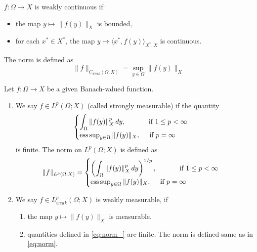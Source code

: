 \begin{defn}
    $f:\Omega \to X$ is weakly continuous if:
    \begin{itemize}
        \item the map $y \mapsto \|f(y)\|_{X}$ is bounded,
        \item for each $x^* \in X^*$, the map $y \mapsto \langle x^*, f(y)\rangle_{X^*, X}$ is continuous.
    \end{itemize} 
    The norm is defined as
    $$\|f\|_{C_{weak}(\Omega;X)} = \sup_{y \in \Omega} \|f(y)\|_{X}$$
\end{defn}
\begin{defn}

    Let $f:\Omega \to X$ be a given Banach-valued function.
    \begin{enumerate}
        \item We say $f\in L^p(\Omega; X)$ (called strongly measurable) if the quantity \begin{equation} \label{eq:norm_}
            \begin{cases}
                \displaystyle \int_{\Omega} \|f(y)\|^p_{X}\, dy, \quad \qquad \text{ if } 1 \leq p < \infty \\
                \operatorname*{ess\,sup}_{y \in \Omega} \|f(y)\|_{X}, \quad \text{ if } p = \infty
            \end{cases}
        \end{equation}
        is finite. The norm on $L^p(\Omega; X)$ is defined as \begin{equation} \label{eq:norm}
            \|f\|_{L^p(\Omega; X)} = \begin{cases}
                                        \left(\displaystyle\int_{\Omega} \|f(y)\|^p_{X}\, dy\right)^{1/p}, \quad \qquad \text{ if } 1 \leq p < \infty \\
                                        \operatorname*{ess\,sup}_{y \in \Omega} \|f(y)\|_{X}, \quad \text{ if } p = \infty
                                    \end{cases}
        \end{equation}
        \item We say $f\in L^p_{weak}(\Omega; X)$ is weakly measurable, if \begin{enumerate}
            \item the map $y \mapsto \|f(y)\|_{X}$ is measurable.
            \item quantities defined in \ref{eq:norm_} are finite. The norm is defined same as in \ref{eq:norm}.

\end{enumerate}
\end{enumerate}
\end{defn}
